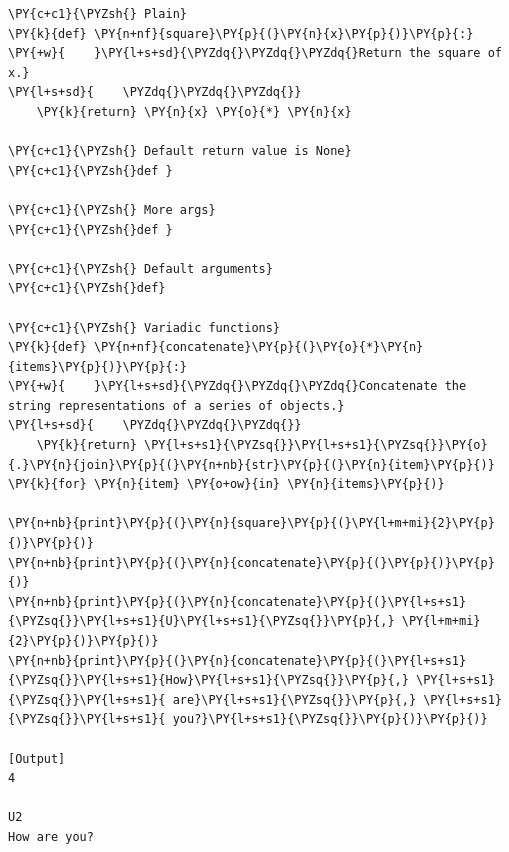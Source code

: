 \begin{Verbatim}[label=\makebox{\url{https://github.com/lucabaldini/cmepda/tree/master/slides/latex/snippets/functions.py}},commandchars=\\\{\}]
\PY{c+c1}{\PYZsh{} Plain}
\PY{k}{def} \PY{n+nf}{square}\PY{p}{(}\PY{n}{x}\PY{p}{)}\PY{p}{:}
\PY{+w}{    }\PY{l+s+sd}{\PYZdq{}\PYZdq{}\PYZdq{}Return the square of x.}
\PY{l+s+sd}{    \PYZdq{}\PYZdq{}\PYZdq{}}
    \PY{k}{return} \PY{n}{x} \PY{o}{*} \PY{n}{x}

\PY{c+c1}{\PYZsh{} Default return value is None}
\PY{c+c1}{\PYZsh{}def }

\PY{c+c1}{\PYZsh{} More args}
\PY{c+c1}{\PYZsh{}def }

\PY{c+c1}{\PYZsh{} Default arguments}
\PY{c+c1}{\PYZsh{}def}

\PY{c+c1}{\PYZsh{} Variadic functions}
\PY{k}{def} \PY{n+nf}{concatenate}\PY{p}{(}\PY{o}{*}\PY{n}{items}\PY{p}{)}\PY{p}{:}
\PY{+w}{    }\PY{l+s+sd}{\PYZdq{}\PYZdq{}\PYZdq{}Concatenate the string representations of a series of objects.}
\PY{l+s+sd}{    \PYZdq{}\PYZdq{}\PYZdq{}}
    \PY{k}{return} \PY{l+s+s1}{\PYZsq{}}\PY{l+s+s1}{\PYZsq{}}\PY{o}{.}\PY{n}{join}\PY{p}{(}\PY{n+nb}{str}\PY{p}{(}\PY{n}{item}\PY{p}{)} \PY{k}{for} \PY{n}{item} \PY{o+ow}{in} \PY{n}{items}\PY{p}{)}

\PY{n+nb}{print}\PY{p}{(}\PY{n}{square}\PY{p}{(}\PY{l+m+mi}{2}\PY{p}{)}\PY{p}{)}
\PY{n+nb}{print}\PY{p}{(}\PY{n}{concatenate}\PY{p}{(}\PY{p}{)}\PY{p}{)}
\PY{n+nb}{print}\PY{p}{(}\PY{n}{concatenate}\PY{p}{(}\PY{l+s+s1}{\PYZsq{}}\PY{l+s+s1}{U}\PY{l+s+s1}{\PYZsq{}}\PY{p}{,} \PY{l+m+mi}{2}\PY{p}{)}\PY{p}{)}
\PY{n+nb}{print}\PY{p}{(}\PY{n}{concatenate}\PY{p}{(}\PY{l+s+s1}{\PYZsq{}}\PY{l+s+s1}{How}\PY{l+s+s1}{\PYZsq{}}\PY{p}{,} \PY{l+s+s1}{\PYZsq{}}\PY{l+s+s1}{ are}\PY{l+s+s1}{\PYZsq{}}\PY{p}{,} \PY{l+s+s1}{\PYZsq{}}\PY{l+s+s1}{ you?}\PY{l+s+s1}{\PYZsq{}}\PY{p}{)}\PY{p}{)}

[Output]
4

U2
How are you?
\end{Verbatim}